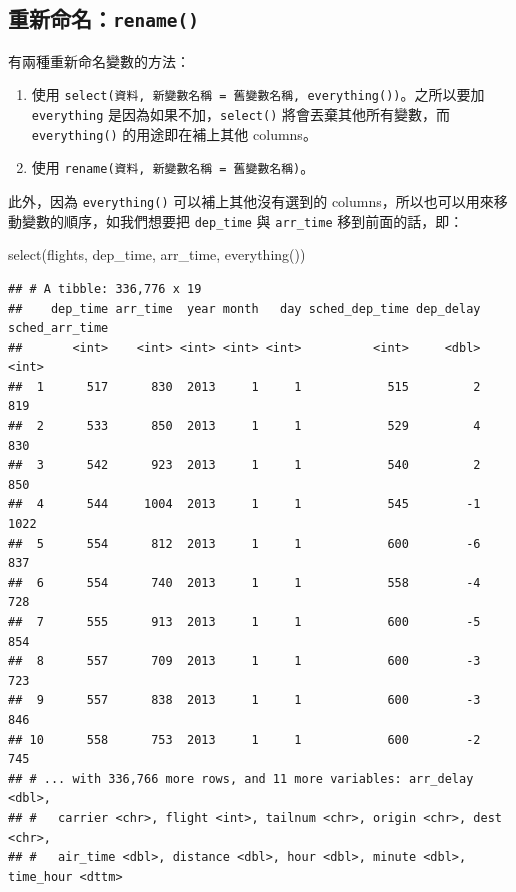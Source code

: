 \documentclass[
]{book}
\newenvironment{Shaded}{\begin{snugshade}}{\end{snugshade}}
\newcommand{\FunctionTok}[1]{\textcolor[rgb]{0.00,0.00,0.00}{#1}}
\newcommand{\NormalTok}[1]{#1}
\theoremstyle{definition}
\theoremstyle{remark}
\begin{document}
\hypertarget{ux91cdux65b0ux547dux540drename}{%
\subsection{\texorpdfstring{重新命名：\texttt{rename()}}{重新命名：rename()}}\label{ux91cdux65b0ux547dux540drename}}

有兩種重新命名變數的方法：

\begin{enumerate}
\def\labelenumi{\arabic{enumi}.}
\item
  使用 \texttt{select(資料,\ 新變數名稱\ =\ 舊變數名稱,\ everything())}。之所以要加 \texttt{everything} 是因為如果不加，\texttt{select()} 將會丟棄其他所有變數，而 \texttt{everything()} 的用途即在補上其他 columns。
\item
  使用 \texttt{rename(資料,\ 新變數名稱\ =\ 舊變數名稱)}。
\end{enumerate}

此外，因為 \texttt{everything()} 可以補上其他沒有選到的 columns，所以也可以用來移動變數的順序，如我們想要把 \texttt{dep\_time} 與 \texttt{arr\_time} 移到前面的話，即：

\begin{Shaded}
\begin{Highlighting}[]
\FunctionTok{select}\NormalTok{(flights, dep\_time, arr\_time, }\FunctionTok{everything}\NormalTok{())}
\end{Highlighting}
\end{Shaded}

\begin{verbatim}
## # A tibble: 336,776 x 19
##    dep_time arr_time  year month   day sched_dep_time dep_delay sched_arr_time
##       <int>    <int> <int> <int> <int>          <int>     <dbl>          <int>
##  1      517      830  2013     1     1            515         2            819
##  2      533      850  2013     1     1            529         4            830
##  3      542      923  2013     1     1            540         2            850
##  4      544     1004  2013     1     1            545        -1           1022
##  5      554      812  2013     1     1            600        -6            837
##  6      554      740  2013     1     1            558        -4            728
##  7      555      913  2013     1     1            600        -5            854
##  8      557      709  2013     1     1            600        -3            723
##  9      557      838  2013     1     1            600        -3            846
## 10      558      753  2013     1     1            600        -2            745
## # ... with 336,766 more rows, and 11 more variables: arr_delay <dbl>,
## #   carrier <chr>, flight <int>, tailnum <chr>, origin <chr>, dest <chr>,
## #   air_time <dbl>, distance <dbl>, hour <dbl>, minute <dbl>, time_hour <dttm>
\end{verbatim}
\end{document}
